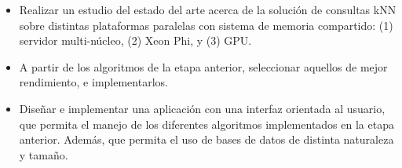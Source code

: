 \begin{itemize}

\item Realizar un estudio del estado del arte acerca de la solución de consultas kNN sobre distintas
plataformas paralelas con sistema de memoria compartido: (1) servidor multi-núcleo, (2) Xeon Phi, y (3) GPU.

\item A partir de los algoritmos de la etapa anterior, seleccionar aquellos de mejor rendimiento, e
implementarlos.

\item Diseñar e implementar una aplicación con una interfaz orientada al usuario, que permita el manejo
de los diferentes algoritmos implementados en la etapa anterior. Además, que permita el uso de bases
de datos de distinta naturaleza y tamaño.

	
\end{itemize}



